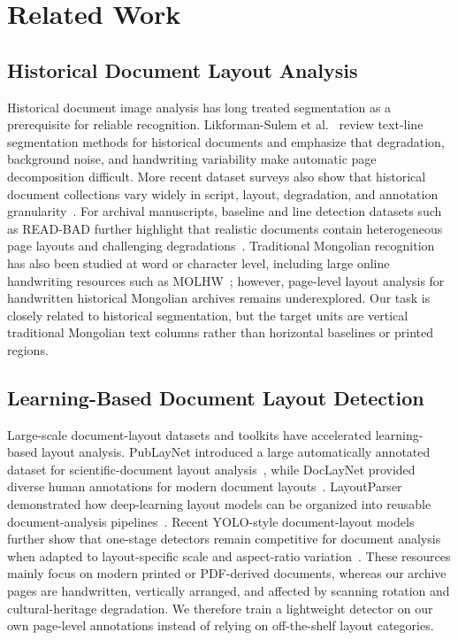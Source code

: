 \documentclass[pdflatex,sn-mathphys-num]{sn-jnl}
\begin{document}
\section{Related Work}
\subsection{Historical Document Layout Analysis}
Historical document image analysis has long treated segmentation as a prerequisite for reliable recognition. Likforman-Sulem et al.~\cite{likforman2007textline} review text-line segmentation methods for historical documents and emphasize that degradation, background noise, and handwriting variability make automatic page decomposition difficult. More recent dataset surveys also show that historical document collections vary widely in script, layout, degradation, and annotation granularity~\cite{nikolaidou2022survey}. For archival manuscripts, baseline and line detection datasets such as READ-BAD further highlight that realistic documents contain heterogeneous page layouts and challenging degradations~\cite{gruning2017readbad}. Traditional Mongolian recognition has also been studied at word or character level, including large online handwriting resources such as MOLHW~\cite{pan2023molhw}; however, page-level layout analysis for handwritten historical Mongolian archives remains underexplored. Our task is closely related to historical segmentation, but the target units are vertical traditional Mongolian text columns rather than horizontal baselines or printed regions.

\subsection{Learning-Based Document Layout Detection}
Large-scale document-layout datasets and toolkits have accelerated learning-based layout analysis. PubLayNet introduced a large automatically annotated dataset for scientific-document layout analysis~\cite{zhong2019publaynet}, while DocLayNet provided diverse human annotations for modern document layouts~\cite{pfitzmann2022doclaynet}. LayoutParser demonstrated how deep-learning layout models can be organized into reusable document-analysis pipelines~\cite{shen2021layoutparser}. Recent YOLO-style document-layout models further show that one-stage detectors remain competitive for document analysis when adapted to layout-specific scale and aspect-ratio variation~\cite{deng2023yolo, zhao2024doclayout}. These resources mainly focus on modern printed or PDF-derived documents, whereas our archive pages are handwritten, vertically arranged, and affected by scanning rotation and cultural-heritage degradation. We therefore train a lightweight detector on our own page-level annotations instead of relying on off-the-shelf layout categories.
\end{document}
